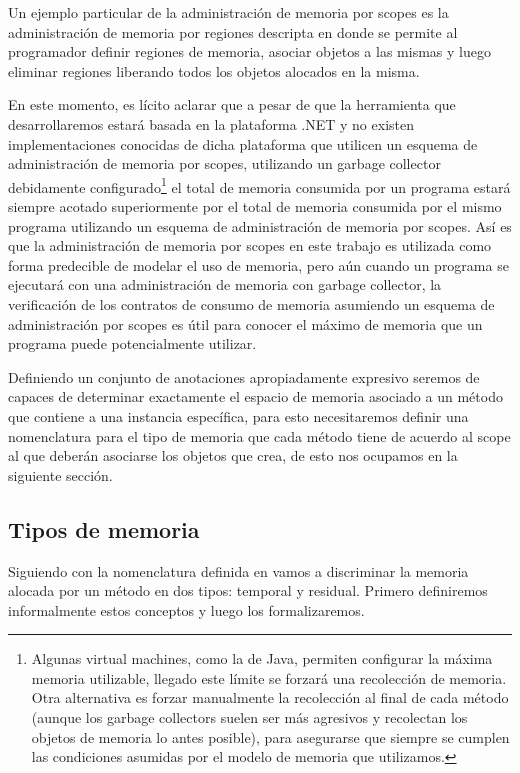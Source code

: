 \documentclass[12pt,a4paper]{article}
\begin{document}
			Un ejemplo particular de la administración de memoria por scopes es la administración de memoria por regiones descripta en \cite{regmem} donde se permite al programador definir regiones de memoria, asociar objetos a las mismas y luego eliminar regiones liberando todos los objetos alocados en la misma.

			En este momento, es lícito aclarar que a pesar de que la herramienta que desarrollaremos estará basada en la plataforma .NET y no existen implementaciones conocidas de dicha plataforma que utilicen un esquema de administración de memoria por scopes, utilizando un garbage collector debidamente configurado\footnote{Algunas virtual machines, como la de Java, permiten configurar la máxima memoria utilizable, llegado este límite se forzará una recolección de memoria. Otra alternativa es forzar manualmente la recolección al final de cada método (aunque los garbage collectors suelen ser más agresivos y recolectan los objetos de memoria lo antes posible), para asegurarse que siempre se cumplen las condiciones asumidas por el modelo de memoria que utilizamos.} el total de memoria consumida por un programa estará siempre acotado superiormente por el total de memoria consumida por el mismo programa utilizando un esquema de administración de memoria por scopes. Así es que la administración de memoria por scopes en este trabajo es utilizada como forma predecible de modelar el uso de memoria, pero aún cuando un programa se ejecutará con una administración de memoria con garbage collector, la verificación de los contratos de consumo de memoria asumiendo un esquema de administración por scopes es útil para conocer el máximo de memoria que un programa puede potencialmente utilizar.

			Definiendo un conjunto de anotaciones apropiadamente expresivo seremos de capaces de determinar exactamente el espacio de memoria asociado a un método que contiene a una instancia específica, para esto necesitaremos definir una nomenclatura para el tipo de memoria que cada método tiene de acuerdo al scope al que deberán asociarse los objetos que crea, de esto nos ocupamos en la siguiente sección.
		\subsection{Tipos de memoria} \label{sec:tiposmem}
			Siguiendo con la nomenclatura definida en \cite{Rou09} vamos a discriminar la memoria alocada por un método en dos tipos: temporal y residual. Primero definiremos informalmente estos conceptos y luego los formalizaremos.
\end{document}
